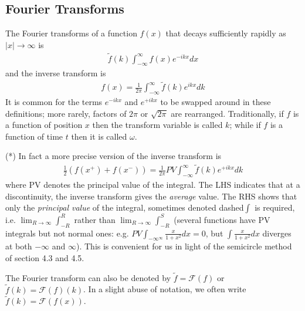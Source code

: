 \documentclass[a4paper]{article}
\begin{document}
\subsection{Fourier Transforms}
The Fourier transforms of a function $f(x)$ that decays sufficiently rapidly as $|x| \to \infty$ is
\begin{equation*}
\begin{aligned}
\tilde{f}(k) \int_{-\infty}^\infty f(x) e^{-ikx} dx
\end{aligned}
\end{equation*}
and the inverse transform is
\begin{equation*}
\begin{aligned}
f(x) = \frac{1}{2\pi} \int_{-\infty}^\infty\tilde{f}(k) e^{ikx} dk
\end{aligned} 
\end{equation*}
It is common for the terms $e^{-ikx}$ and $e^{+ikx}$ to be swapped around in these definitions; more rarely, factors of $2\pi$ or $\sqrt{2\pi}$ are rearranged. Traditionally, if $f$ is a function of position $x$ then the transform variable is called $k$; while if $f$ is a function of time $t$ then it is called $\omega$.

(*) In fact a more precise version of the inverse transform is
\begin{equation*}
\begin{aligned}
\frac{1}{2}(f(x^+)+f(x^-)) = \frac{1}{2\pi} PV \int_{-\infty}^\infty \tilde{f}(k) e^{+ikx} dk
\end{aligned}
\end{equation*}
where PV denotes the principal value of the integral. The LHS indicates that at a discontinuity, the inverse transform gives the \emph{average} value. The RHS shows that only the \emph{principal value} of the integral, sometimes denoted dashed$\int$ is required, i.e. $\lim_{R \to \infty} \int_{-R}^R$ rather than $\lim_{R \to \infty} \int_{-R}^S$ (several functions have PV integrals but not normal ones: e.g. $PV \int_{-\infty^\infty} \frac{x}{1+x^2} dx = 0$, but $\int \frac{x}{1+x^2} dx$ diverges at both $-\infty$ and $\infty$). This is convenient for us in light of the semicircle method of section 4.3 and 4.5.

The Fourier transform can also be denoted by $\tilde{f} = \mathcal{F}(f)$ or $\tilde{f}(k) = \mathcal{F}(f) (k)$. In a slight abuse of notation, we often write $\tilde{f}(k) = \mathcal{F}(f(x))$.
\end{document}
